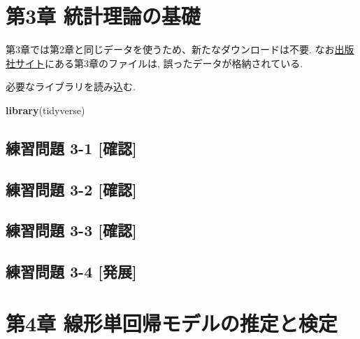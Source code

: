 \documentclass[
]{book}
\newenvironment{Shaded}{\begin{snugshade}}{\end{snugshade}}
\newcommand{\FunctionTok}[1]{\textcolor[rgb]{0.13,0.29,0.53}{\textbf{#1}}}
\newcommand{\NormalTok}[1]{#1}
\begin{document}
\hypertarget{ch3}{%
\chapter*{第3章 統計理論の基礎}\label{ch3}}

第3章では第2章と同じデータを使うため、新たなダウンロードは不要.
なお\href{https://www.yuhikaku.co.jp/books/detail/9784641053854}{出版社サイト}にある第3章のファイルは, 誤ったデータが格納されている.

必要なライブラリを読み込む.

\begin{Shaded}
\begin{Highlighting}[]
\FunctionTok{library}\NormalTok{(tidyverse)}
\end{Highlighting}
\end{Shaded}

\hypertarget{ux7df4ux7fd2ux554fux984c-3-1-ux78baux8a8d}{%
\section*{練習問題 3-1 {[}確認{]}}\label{ux7df4ux7fd2ux554fux984c-3-1-ux78baux8a8d}}

\hypertarget{ux7df4ux7fd2ux554fux984c-3-2-ux78baux8a8d}{%
\section*{練習問題 3-2 {[}確認{]}}\label{ux7df4ux7fd2ux554fux984c-3-2-ux78baux8a8d}}

\hypertarget{ux7df4ux7fd2ux554fux984c-3-3-ux78baux8a8d}{%
\section*{練習問題 3-3 {[}確認{]}}\label{ux7df4ux7fd2ux554fux984c-3-3-ux78baux8a8d}}

\hypertarget{ux7df4ux7fd2ux554fux984c-3-4-ux767aux5c55}{%
\section*{練習問題 3-4 {[}発展{]}}\label{ux7df4ux7fd2ux554fux984c-3-4-ux767aux5c55}}

\hypertarget{ch4}{%
\chapter*{第4章 線形単回帰モデルの推定と検定}\label{ch4}}
\end{document}
